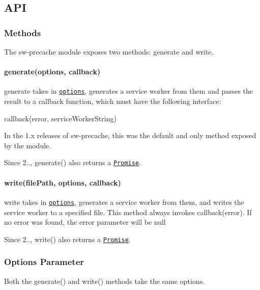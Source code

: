 \subsection*{A\+PI}

\subsubsection*{Methods}

The {\ttfamily sw-\/precache} module exposes two methods\+: {\ttfamily generate} and {\ttfamily write}.

\paragraph*{generate(options, callback)}

{\ttfamily generate} takes in \href{#options}{\tt options}, generates a service worker from them and passes the result to a callback function, which must have the following interface\+:

{\ttfamily callback(error, service\+Worker\+String)}

In the 1.\+x releases of {\ttfamily sw-\/precache}, this was the default and only method exposed by the module.

Since 2.., {\ttfamily generate()} also returns a \href{https://developer.mozilla.org/en-US/docs/Web/JavaScript/Reference/Global_Objects/Promise}{\tt {\ttfamily Promise}}.

\paragraph*{write(file\+Path, options, callback)}

{\ttfamily write} takes in \href{#options}{\tt options}, generates a service worker from them, and writes the service worker to a specified file. This method always invokes {\ttfamily callback(error)}. If no error was found, the {\ttfamily error} parameter will be {\ttfamily null}

Since 2.., {\ttfamily write()} also returns a \href{https://developer.mozilla.org/en-US/docs/Web/JavaScript/Reference/Global_Objects/Promise}{\tt {\ttfamily Promise}}.

\subsubsection*{Options Parameter}

Both the {\ttfamily generate()} and {\ttfamily write()} methods take the same options.

